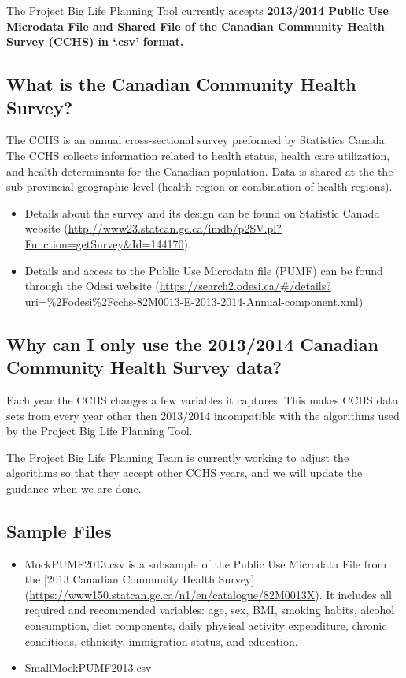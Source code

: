 \documentclass[]{book}
\providecommand{\tightlist}{%
  \setlength{\itemsep}{0pt}\setlength{\parskip}{0pt}}
\begin{document}
The Project Big Life Planning Tool currently accepts \textbf{2013/2014
Public Use Microdata File and Shared File of the Canadian Community
Health Survey (CCHS) in `.csv' format.}

\subsection{What is the Canadian Community Health
Survey?}\label{what-is-the-canadian-community-health-survey}

The CCHS is an annual cross-sectional survey preformed by Statistics
Canada. The CCHS collects information related to health status, health
care utilization, and health determinants for the Canadian population.
Data is shared at the the sub-provincial geographic level (health region
or combination of health regions).

\begin{itemize}
\tightlist
\item
  Details about the survey and its design can be found on Statistic
  Canada website
  (\url{http://www23.statcan.gc.ca/imdb/p2SV.pl?Function=getSurvey\&Id=144170}).
\item
  Details and access to the Public Use Microdata file (PUMF) can be
  found through the Odesi website
  (\url{https://search2.odesi.ca/\#/details?uri=\%2Fodesi\%2Fcchs-82M0013-E-2013-2014-Annual-component.xml})
\end{itemize}

\subsection{Why can I only use the 2013/2014 Canadian Community Health
Survey
data?}\label{why-can-i-only-use-the-20132014-canadian-community-health-survey-data}

Each year the CCHS changes a few variables it captures. This makes CCHS
data sets from every year other then 2013/2014 incompatible with the
algorithms used by the Project Big Life Planning Tool.

The Project Big Life Planning Team is currently working to adjust the
algorithms so that they accept other CCHS years, and we will update the
guidance when we are done.

\subsection{Sample Files}\label{sample-files}

\begin{itemize}
\item
  MockPUMF2013.csv is a subsample of the Public Use Microdata File from
  the {[}2013 Canadian Community Health Survey{]}
  (\url{https://www150.statcan.gc.ca/n1/en/catalogue/82M0013X}). It
  includes all required and recommended variables: age, sex, BMI,
  smoking habits, alcohol consumption, diet components, daily physical
  activity expenditure, chronic conditions, ethnicity, immigration
  status, and education.
\item
  SmallMockPUMF2013.csv
\end{itemize}
\end{document}

